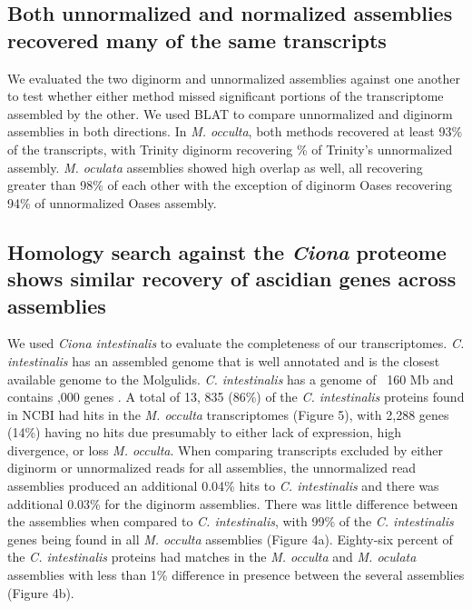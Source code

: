 \subsection{Both unnormalized and normalized assemblies recovered many of the same transcripts}
We evaluated the two diginorm and unnormalized assemblies against one another to test whether either method missed significant portions of the transcriptome assembled by the other. We used BLAT to compare unnormalized and diginorm assemblies in both directions. In \textit{M. occulta}, both methods recovered at least 93\% of the transcripts, with Trinity diginorm recovering \% of Trinity's unnormalized assembly. \textit{M. oculata} assemblies showed high overlap as well, all recovering greater than 98\% of each other with the exception of diginorm Oases recovering 94\% of unnormalized Oases assembly.

\subsection{Homology search against the \textit{Ciona} proteome shows similar recovery of ascidian genes across assemblies}
We used \textit{Ciona intestinalis} to evaluate the completeness of our transcriptomes. \textit{C. intestinalis} has an assembled genome that is well annotated and is the closest available genome to the Molgulids. \textit{C. intestinalis} has a genome of ~160 Mb and contains ,000 genes \citep{satoh_surfing_2005}. A total of 13, 835 (86\%) of the \textit{C. intestinalis} proteins found in NCBI had hits in the \textit{M. occulta} transcriptomes (Figure 5), with 2,288 genes (14\%) having no hits due presumably to either lack of expression, high divergence, or loss \textit{M. occulta}. When comparing transcripts excluded by either diginorm or unnormalized reads for all assemblies, the unnormalized read assemblies produced an additional 0.04\% hits to \textit{C. intestinalis} and there was additional 0.03\% for the diginorm assemblies. There was little difference between the assemblies when compared to \textit{C. intestinalis}, with 99\% of the \textit{C. intestinalis} genes being found in all \textit{M. occulta} assemblies (Figure 4a). Eighty-six percent of the \textit{C. intestinalis} proteins had matches in the \textit{M. occulta} and \textit{M. oculata} assemblies with less than 1\% difference in presence between the several assemblies (Figure 4b).
     
